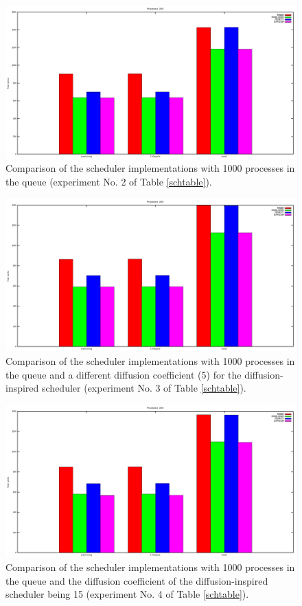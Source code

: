 \begin{figure}
\centering
\includegraphics[scale=0.3]{sch1000.png}
\caption{Comparison of the scheduler implementations with 1000 processes in the queue (experiment No. 2 of Table \ref{schtable}).}
\label{schk}
\end{figure}

\begin{figure}
\centering
\includegraphics[scale=0.3]{5sch1000.png}
\caption{Comparison of the scheduler implementations with 1000 processes in the queue and a different diffusion coefficient (5) for the diffusion-inspired scheduler (experiment No. 3 of Table \ref{schtable}).}
\label{fiveschk}
\end{figure}

\begin{figure}
\centering
\includegraphics[scale=0.3]{15sch1000.png}
\caption{Comparison of the scheduler implementations with 1000 processes in the queue and the diffusion coefficient of the diffusion-inspired scheduler being 15 (experiment No. 4 of Table \ref{schtable}).}
\label{fifteenschk}
\end{figure}
		
